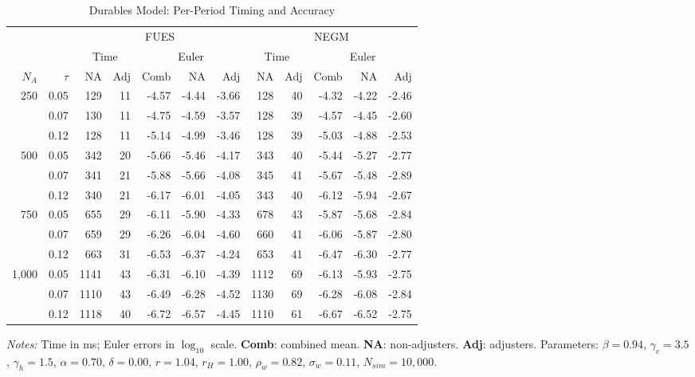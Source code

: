 \documentclass[11pt]{article}
\begin{document}
\pagestyle{empty}
\begin{table}[htbp]
\centering
\begingroup
\small
\setlength{\tabcolsep}{3pt}
\renewcommand{\arraystretch}{1.05}
\caption{Durables Model: Per-Period Timing and Accuracy}
\label{table:housing1}
\begin{tabular}{@{}rr rrrrr rrrrr@{}}
\toprule
& & \multicolumn{5}{c}{FUES} & \multicolumn{5}{c}{NEGM} \\
\cmidrule(lr){3-7} \cmidrule(lr){8-12}
& & \multicolumn{2}{c}{Time} & \multicolumn{3}{c}{Euler} & \multicolumn{2}{c}{Time} & \multicolumn{3}{c}{Euler} \\
\cmidrule(lr){3-4} \cmidrule(lr){5-7} \cmidrule(lr){8-9} \cmidrule(lr){10-12}
$N_A$ & $\tau$ & NA & Adj & Comb & NA & Adj & NA & Adj & Comb & NA & Adj \\
\midrule
250 & 0.05 & 129 & 11 & -4.57 & -4.44 & -3.66 & 128 & 40 & -4.32 & -4.22 & -2.46 \\
 & 0.07 & 130 & 11 & -4.75 & -4.59 & -3.57 & 128 & 39 & -4.57 & -4.45 & -2.60 \\
 & 0.12 & 128 & 11 & -5.14 & -4.99 & -3.46 & 128 & 39 & -5.03 & -4.88 & -2.53 \\
\midrule
500 & 0.05 & 342 & 20 & -5.66 & -5.46 & -4.17 & 343 & 40 & -5.44 & -5.27 & -2.77 \\
 & 0.07 & 341 & 21 & -5.88 & -5.66 & -4.08 & 345 & 41 & -5.67 & -5.48 & -2.89 \\
 & 0.12 & 340 & 21 & -6.17 & -6.01 & -4.05 & 343 & 40 & -6.12 & -5.94 & -2.67 \\
\midrule
750 & 0.05 & 655 & 29 & -6.11 & -5.90 & -4.33 & 678 & 43 & -5.87 & -5.68 & -2.84 \\
 & 0.07 & 659 & 29 & -6.26 & -6.04 & -4.60 & 660 & 41 & -6.06 & -5.87 & -2.80 \\
 & 0.12 & 663 & 31 & -6.53 & -6.37 & -4.24 & 653 & 41 & -6.47 & -6.30 & -2.77 \\
\midrule
1,000 & 0.05 & 1141 & 43 & -6.31 & -6.10 & -4.39 & 1112 & 69 & -6.13 & -5.93 & -2.75 \\
 & 0.07 & 1110 & 43 & -6.49 & -6.28 & -4.52 & 1130 & 69 & -6.28 & -6.08 & -2.84 \\
 & 0.12 & 1118 & 40 & -6.72 & -6.57 & -4.45 & 1110 & 61 & -6.67 & -6.52 & -2.75 \\
\bottomrule
\end{tabular}
\vspace{0.3em}
\par\small \textit{Notes:} Time in ms; Euler errors in $\log_{10}$ scale. \textbf{Comb}: combined mean. \textbf{NA}: non-adjusters. \textbf{Adj}: adjusters. Parameters: $\beta=0.94$, $\gamma_c=3.5$, $\gamma_h=1.5$, $\alpha=0.70$, $\delta=0.00$, $r=1.04$, $r_H=1.00$, $\rho_w=0.82$, $\sigma_w=0.11$, $N_{sim}=10,000$.
\endgroup
\end{table}
\end{document}
